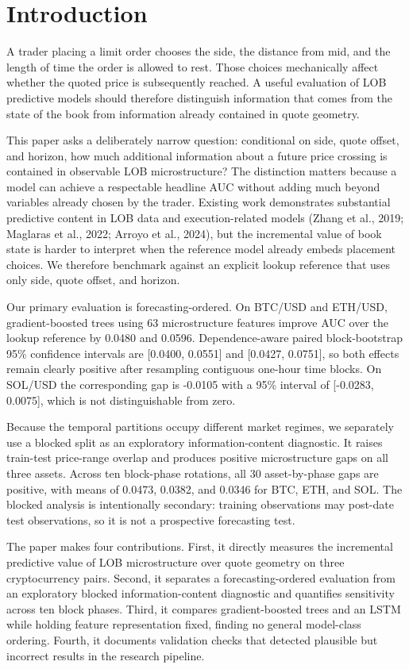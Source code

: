 \documentclass[11pt]{article}
\begin{document}
\section{Introduction}
A trader placing a limit order chooses the side, the distance from mid, and the length of time the order is allowed to rest. Those choices mechanically affect whether the quoted price is subsequently reached. A useful evaluation of LOB predictive models should therefore distinguish information that comes from the state of the book from information already contained in quote geometry.

This paper asks a deliberately narrow question: conditional on side, quote offset, and horizon, how much additional information about a future price crossing is contained in observable LOB microstructure? The distinction matters because a model can achieve a respectable headline AUC without adding much beyond variables already chosen by the trader. Existing work demonstrates substantial predictive content in LOB data and execution-related models (Zhang et al., 2019; Maglaras et al., 2022; Arroyo et al., 2024), but the incremental value of book state is harder to interpret when the reference model already embeds placement choices. We therefore benchmark against an explicit lookup reference that uses only side, quote offset, and horizon.

Our primary evaluation is forecasting-ordered. On BTC/USD and ETH/USD, gradient-boosted trees using 63 microstructure features improve AUC over the lookup reference by 0.0480 and 0.0596. Dependence-aware paired block-bootstrap 95\% confidence intervals are [0.0400, 0.0551] and [0.0427, 0.0751], so both effects remain clearly positive after resampling contiguous one-hour time blocks. On SOL/USD the corresponding gap is -0.0105 with a 95\% interval of [-0.0283, 0.0075], which is not distinguishable from zero.

Because the temporal partitions occupy different market regimes, we separately use a blocked split as an exploratory information-content diagnostic. It raises train-test price-range overlap and produces positive microstructure gaps on all three assets. Across ten block-phase rotations, all 30 asset-by-phase gaps are positive, with means of 0.0473, 0.0382, and 0.0346 for BTC, ETH, and SOL. The blocked analysis is intentionally secondary: training observations may post-date test observations, so it is not a prospective forecasting test.

The paper makes four contributions. First, it directly measures the incremental predictive value of LOB microstructure over quote geometry on three cryptocurrency pairs. Second, it separates a forecasting-ordered evaluation from an exploratory blocked information-content diagnostic and quantifies sensitivity across ten block phases. Third, it compares gradient-boosted trees and an LSTM while holding feature representation fixed, finding no general model-class ordering. Fourth, it documents validation checks that detected plausible but incorrect results in the research pipeline.
\end{document}
